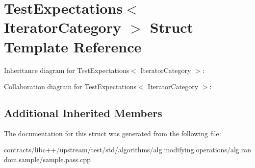 \hypertarget{struct_test_expectations}{}\section{Test\+Expectations$<$ Iterator\+Category $>$ Struct Template Reference}
\label{struct_test_expectations}


Inheritance diagram for Test\+Expectations$<$ Iterator\+Category $>$\+:


Collaboration diagram for Test\+Expectations$<$ Iterator\+Category $>$\+:
\subsection*{Additional Inherited Members}


The documentation for this struct was generated from the following file\+:\begin{DoxyCompactItemize}
\item 
contracts/libc++/upstream/test/std/algorithms/alg.\+modifying.\+operations/alg.\+random.\+sample/sample.\+pass.\+cpp\end{DoxyCompactItemize}
